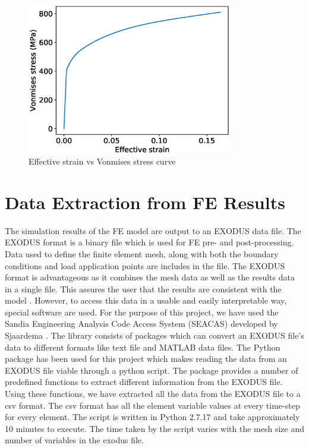 \begin{figure}[!h]
	\centering
	\includegraphics[width=0.8\textwidth]{Pictures/stress-strain.eps}
	\hspace{1mm}
	\caption{Effective strain vs Vonmises stress curve} 
	\label{fig:stress-strain}
\end{figure}

\section{Data Extraction from FE Results}
The simulation results of the FE model are output to an EXODUS data file. The EXODUS format is a binary file which is used for FE pre- and post-processing. Data used to define the finite element mesh, along with both the boundary conditions and load application points are includes in the file. The EXODUS format is advantageous as it combines the mesh data as well as the results data in a single file. This assures the user that the results are consistent with the model \cite{mills1988exodus}. However, to access this data in a usable and easily interpretable way, special software are used. For the purpose of this project, we have used the  Sandia Engineering Analysis Code Access System (SEACAS) developed by Sjaardema \cite{seacas}. The library consists of packages which can convert an EXODUS file's data to different formats like text file and MATLAB data files. The Python package has been used for this project which makes reading the data from an EXODUS file viable through a python script. The package provides a number of predefined functions to extract different information from the EXODUS file. Using these functions, we have extracted all the data from the EXODUS file to a csv format. The csv format has all the element variable values at every time-step for every element. The script is written in Python 2.7.17 and take approximately 10 minutes to execute. The time taken by the script varies with the mesh size and number of variables in the exodus file.   

